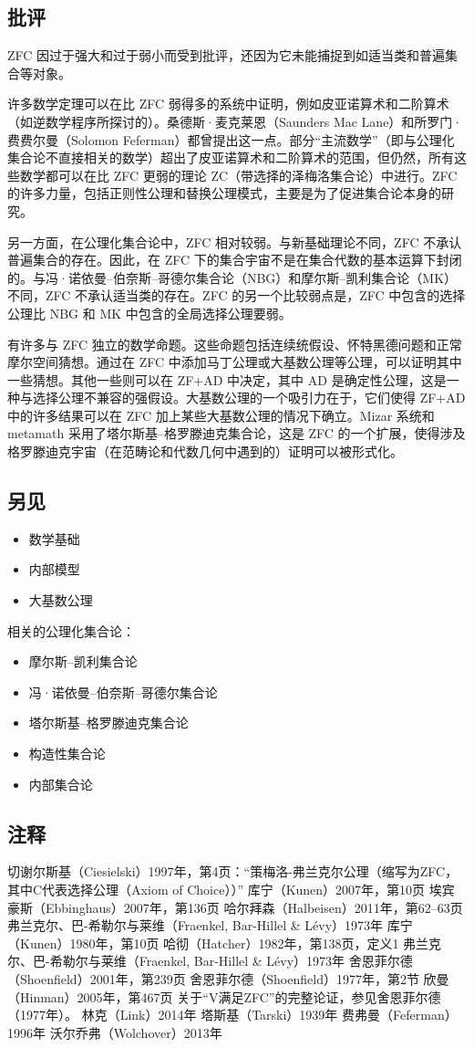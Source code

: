 \subsection{批评}  
ZFC 因过于强大和过于弱小而受到批评，还因为它未能捕捉到如适当类和普遍集合等对象。

许多数学定理可以在比 ZFC 弱得多的系统中证明，例如皮亚诺算术和二阶算术（如逆数学程序所探讨的）。桑德斯·麦克莱恩（Saunders Mac Lane）和所罗门·费费尔曼（Solomon Feferman）都曾提出这一点。部分“主流数学”（即与公理化集合论不直接相关的数学）超出了皮亚诺算术和二阶算术的范围，但仍然，所有这些数学都可以在比 ZFC 更弱的理论 ZC（带选择的泽梅洛集合论）中进行。ZFC 的许多力量，包括正则性公理和替换公理模式，主要是为了促进集合论本身的研究。

另一方面，在公理化集合论中，ZFC 相对较弱。与新基础理论不同，ZFC 不承认普遍集合的存在。因此，在 ZFC 下的集合宇宙不是在集合代数的基本运算下封闭的。与冯·诺依曼–伯奈斯–哥德尔集合论（NBG）和摩尔斯–凯利集合论（MK）不同，ZFC 不承认适当类的存在。ZFC 的另一个比较弱点是，ZFC 中包含的选择公理比 NBG 和 MK 中包含的全局选择公理要弱。

有许多与 ZFC 独立的数学命题。这些命题包括连续统假设、怀特黑德问题和正常摩尔空间猜想。通过在 ZFC 中添加马丁公理或大基数公理等公理，可以证明其中一些猜想。其他一些则可以在 ZF+AD 中决定，其中 AD 是确定性公理，这是一种与选择公理不兼容的强假设。大基数公理的一个吸引力在于，它们使得 ZF+AD 中的许多结果可以在 ZFC 加上某些大基数公理的情况下确立。Mizar 系统和 metamath 采用了塔尔斯基–格罗滕迪克集合论，这是 ZFC 的一个扩展，使得涉及格罗滕迪克宇宙（在范畴论和代数几何中遇到的）证明可以被形式化。
\subsection{另见}  
\begin{itemize}
\item 数学基础  
\item 内部模型  
\item 大基数公理
\end{itemize}  
相关的公理化集合论：
\begin{itemize}
\item 摩尔斯–凯利集合论  
\item 冯·诺依曼–伯奈斯–哥德尔集合论  
\item 塔尔斯基–格罗滕迪克集合论  
\item 构造性集合论  
\item 内部集合论
\end{itemize}
\subsection{注释}
切谢尔斯基（Ciesielski）1997年，第4页：“策梅洛-弗兰克尔公理（缩写为ZFC，其中C代表选择公理（Axiom of Choice））”
库宁（Kunen）2007年，第10页
埃宾豪斯（Ebbinghaus）2007年，第136页
哈尔拜森（Halbeisen）2011年，第62–63页
弗兰克尔、巴-希勒尔与莱维（Fraenkel, Bar-Hillel & Lévy）1973年
库宁（Kunen）1980年，第10页
哈彻（Hatcher）1982年，第138页，定义1
弗兰克尔、巴-希勒尔与莱维（Fraenkel, Bar-Hillel & Lévy）1973年
舍恩菲尔德（Shoenfield）2001年，第239页
舍恩菲尔德（Shoenfield）1977年，第2节
欣曼（Hinman）2005年，第467页
关于“V满足ZFC”的完整论证，参见舍恩菲尔德（1977年）。
林克（Link）2014年
塔斯基（Tarski）1939年
费弗曼（Feferman）1996年
沃尔乔弗（Wolchover）2013年